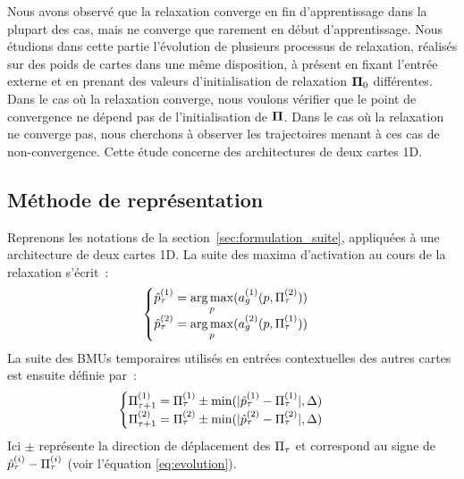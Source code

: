 \documentclass[../main]{subfiles}
\begin{document}
Nous avons observé que la relaxation converge en fin d'apprentissage dans la plupart des cas, mais ne converge que rarement en début d'apprentissage.
Nous étudions dans cette partie l'évolution de plusieurs processus de relaxation, réalisés sur des poids de cartes dans une même disposition, à présent en fixant l'entrée externe et en prenant des valeurs d'initialisation de relaxation $\mathbf{\Pi}_0$ différentes.
Dans le cas où la relaxation converge, nous voulons vérifier que le point de convergence ne dépend pas de l'initialisation de $\mathbf{\Pi}$.
Dans le cas où la relaxation ne converge pas, nous cherchons à observer les trajectoires menant à ces cas de non-convergence. Cette étude concerne des architectures de deux cartes 1D.

\subsection{Méthode de représentation\label{sec:relax_expe}}

Reprenons les notations de la section~\ref{sec:formulation_suite}, appliquées à une architecture de deux cartes 1D. La suite des maxima d'activation au cours de la relaxation s'écrit~:
\begin{equation*}
	\begin{cases}
	\hat{p}^{({1})}_\tau = \operatorname*{arg\,max}\limits_p(a_g^{({1})}(p, \Pi^{({2})}_\tau))\\
	\hat{p}^{({2})}_\tau = \operatorname*{arg\,max}\limits_p(a_g^{({2})}(p, \Pi^{({1})}_\tau)) \\
	\end{cases}
	\end{equation*}
La suite des BMUs temporaires utilisés en entrées contextuelles des autres cartes est ensuite définie par~:
\begin{align*}
	&\begin{cases}
	\Pi^{({1})}_{\tau+1} = \Pi^{({1})}_\tau \pm \min(\lvert \hat{p}^{({1})}_\tau - \Pi^{({1})}_\tau \rvert, \Delta)  \\
	\Pi^{({2})}_{\tau+1} = \Pi^{({2})}_\tau \pm \min(\lvert \hat{p}^{({2})}_\tau - \Pi^{({2})}_\tau \rvert, \Delta) \\
	\end{cases}
	\end{align*}
Ici $\pm$ représente la direction de déplacement des $\Pi_\tau$ et correspond au signe de $\hat{p}^{({i})}_\tau - \Pi^{({i})}_\tau$ (voir l'équation \ref{eq:evolution}).
\end{document}
